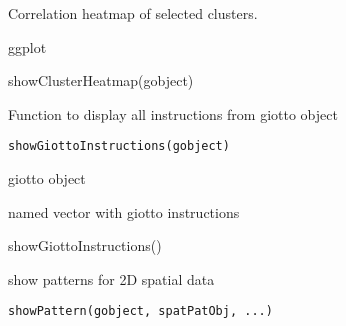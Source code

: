 \documentclass[a4paper]{book}
\begin{document}
%
\begin{Details}\relax
Correlation heatmap of selected clusters.
\end{Details}
%
\begin{Value}
ggplot
\end{Value}
%
\begin{Examples}
\begin{ExampleCode}
    showClusterHeatmap(gobject)
\end{ExampleCode}
\end{Examples}
%
\begin{Description}\relax
Function to display all instructions from giotto object
\end{Description}
%
\begin{Usage}
\begin{verbatim}
showGiottoInstructions(gobject)
\end{verbatim}
\end{Usage}
%
\begin{Arguments}
\begin{ldescription}
\item[\code{gobject}] giotto object
\end{ldescription}
\end{Arguments}
%
\begin{Value}
named vector with giotto instructions
\end{Value}
%
\begin{Examples}
\begin{ExampleCode}
    showGiottoInstructions()
\end{ExampleCode}
\end{Examples}
%
\begin{Description}\relax
show patterns for 2D spatial data
\end{Description}
%
\begin{Usage}
\begin{verbatim}
showPattern(gobject, spatPatObj, ...)
\end{verbatim}
\end{Usage}
%
\end{document}
